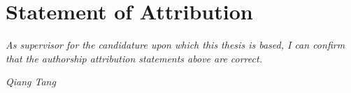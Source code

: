 \chapter*{Statement of Attribution}

\vspace{5cm}

\emph{As supervisor for the candidature upon which this thesis is based, I can confirm that the authorship attribution statements above are correct.}

\vspace{2cm}

\noindent \emph{Qiang Tang}

